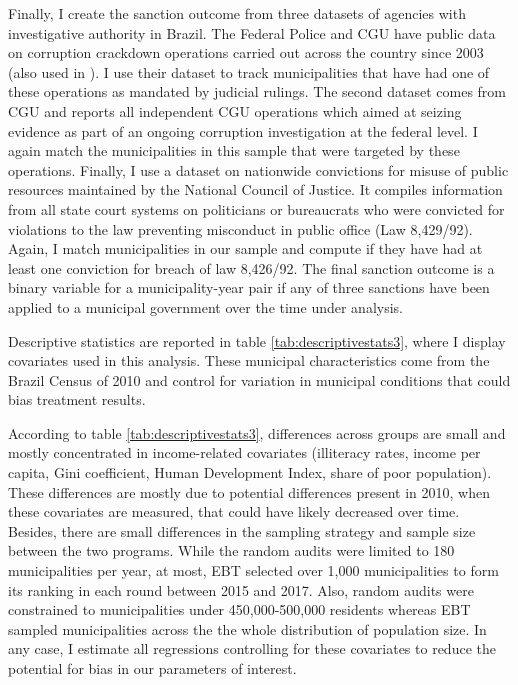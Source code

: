 \documentclass[11pt]{article}
\begin{document}
Finally, I create the sanction outcome from three datasets of agencies with investigative authority in Brazil. The Federal Police and CGU have public data on corruption crackdown operations carried out across the country since 2003 (also used in \citet{AvisGovernmentAuditsReduce2018}). I use their dataset to track municipalities that have had one of these operations as mandated by judicial rulings. The second dataset comes from CGU and reports all independent CGU operations which aimed at seizing evidence as part of an ongoing corruption investigation at the federal level. I again match the municipalities in this sample that were targeted by these operations. Finally, I use a dataset on nationwide convictions for misuse of public resources maintained by the National Council of Justice. It compiles information from all state court systems on politicians or bureaucrats who were convicted for violations to the law preventing misconduct in public office (Law 8,429/92). Again, I match municipalities in our sample and compute if they have had at least one conviction for breach of law 8,426/92. The final sanction outcome is a binary variable for a municipality-year pair if any of three sanctions have been applied to a municipal government over the time under analysis.

Descriptive statistics are reported in table \ref{tab:descriptivestats3}, where I display covariates used in this analysis. These municipal characteristics come from the Brazil Census of 2010 and control for variation in municipal conditions that could bias treatment results.



According to table \ref{tab:descriptivestats3}, differences across groups are small and mostly concentrated in income-related covariates (illiteracy rates, income per capita, Gini coefficient, Human Development Index, share of poor population). These differences are mostly due to potential differences present in 2010, when these covariates are measured, that could have likely decreased over time. Besides, there are small differences in the sampling strategy and sample size between the two programs. While the random audits were limited to 180 municipalities per year, at most, EBT selected over 1,000 municipalities to form its ranking in each round between 2015 and 2017. Also, random audits were constrained to municipalities under 450,000-500,000 residents whereas EBT sampled municipalities across the the whole distribution of population size. In any case, I estimate all regressions controlling for these covariates to reduce the potential for bias in our parameters of interest.
\end{document}

